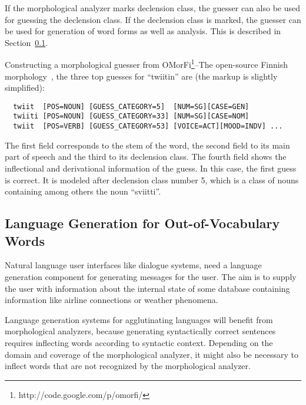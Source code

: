 \documentclass{llncs}
\begin{document}
If the morphological analyzer marks declension class, the guesser can
also be used for guessing the declension class. If the declension
class is marked, the guesser can be used for generation of word forms
as well as analysis. This is described in Section~\ref{sec:morph-generation}.

\begin{sloppypar}
Constructing a morphological guesser from
OMorFi\footnote{http://code.google.com/p/omorfi/}--The open-source
Finnish morphology~\cite{pirinen/2008}, the three top guesses for
``twiitin'' are (the markup is slightly simplified): \small
\begin{verbatim}
  twiit  [POS=NOUN] [GUESS_CATEGORY=5]  [NUM=SG][CASE=GEN]
  twiiti [POS=NOUN] [GUESS_CATEGORY=33] [NUM=SG][CASE=NOM]
  twiit  [POS=VERB] [GUESS_CATEGORY=53] [VOICE=ACT][MOOD=INDV] ...
\end{verbatim}
\normalsize
The first field corresponds to the stem of the word, the second field
to its main part of speech and the third to its declension class. The
fourth field shows the inflectional and derivational information of
the guess. In this case, the first guess is correct. It is modeled
after declension class number 5, which is a class of nouns containing
among others the noun ``sviitti''.
\end{sloppypar}

\subsection{Language Generation for Out-of-Vocabulary Words}
\label{sec:morph-generation}
Natural language user interfaces like dialogue systems, need a
language generation component for generating messages for the
user. The aim is to supply the user with information about the
internal state of some database containing information like airline
connections or weather phenomena.

Language generation systems for agglutinating languages will benefit
from morphological analyzers, because generating syntactically correct
sentences requires inflecting words according to syntactic
context. Depending on the domain and coverage of the morphological
analyzer, it might also be necessary to inflect words that are not
recognized by the morphological analyzer. 
\end{document}
